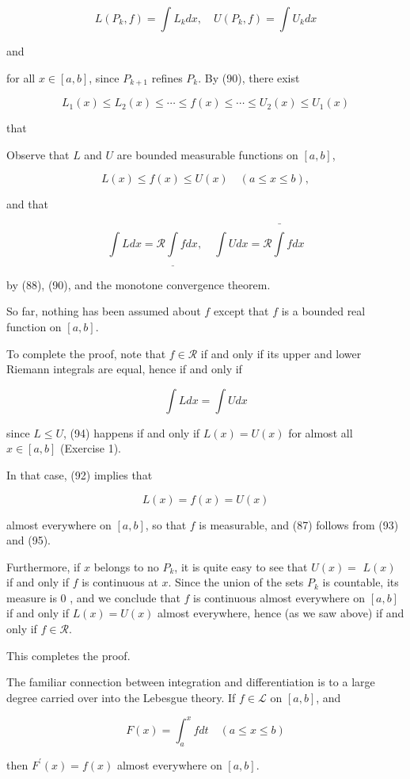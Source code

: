 \documentclass[10pt]{article}
\begin{document}
$$
L\left(P_{k}, f\right)=\int L_{k} d x, \quad U\left(P_{k}, f\right)=\int U_{k} d x
$$

and

for all $x \in[a, b]$, since $P_{k+1}$ refines $P_{k}$. By (90), there exist

$$
L_{1}(x) \leq L_{2}(x) \leq \cdots \leq f(x) \leq \cdots \leq U_{2}(x) \leq U_{1}(x)
$$

that

Observe that $L$ and $U$ are bounded measurable functions on $[a, b]$,

$$
L(x) \leq f(x) \leq U(x) \quad(a \leq x \leq b),
$$

and that

$$
\int L d x=\mathscr{R} \underline{\int} f d x, \quad \int U d x=\mathscr{R} \bar{\int} f d x
$$

by (88), (90), and the monotone convergence theorem.

So far, nothing has been assumed about $f$ except that $f$ is a bounded real function on $[a, b]$.

To complete the proof, note that $f \in \mathscr{R}$ if and only if its upper and lower Riemann integrals are equal, hence if and only if

$$
\int L d x=\int U d x
$$

since $L \leq U$, (94) happens if and only if $L(x)=U(x)$ for almost all $x \in[a, b]$ (Exercise 1).

In that case, (92) implies that

$$
L(x)=f(x)=U(x)
$$

almost everywhere on $[a, b]$, so that $f$ is measurable, and (87) follows from (93) and (95).

Furthermore, if $x$ belongs to no $P_{k}$, it is quite easy to see that $U(x)=$ $L(x)$ if and only if $f$ is continuous at $x$. Since the union of the sets $P_{k}$ is countable, its measure is 0 , and we conclude that $f$ is continuous almost everywhere on $[a, b]$ if and only if $L(x)=U(x)$ almost everywhere, hence (as we saw above) if and only if $f \in \mathscr{R}$.

This completes the proof.

The familiar connection between integration and differentiation is to a large degree carried over into the Lebesgue theory. If $f \in \mathscr{L}$ on $[a, b]$, and

$$
F(x)=\int_{a}^{x} f d t \quad(a \leq x \leq b)
$$

then $F^{\prime}(x)=f(x)$ almost everywhere on $[a, b]$.
\end{document}
